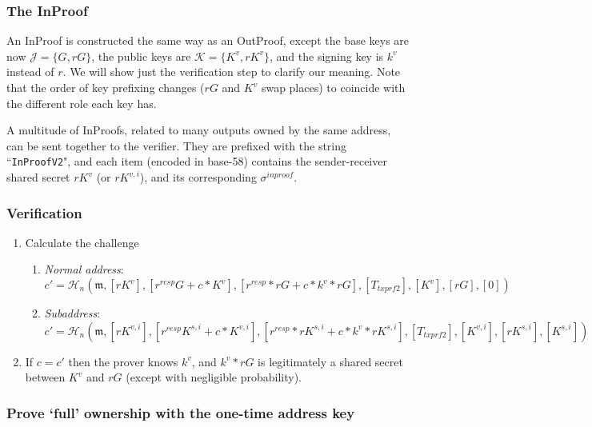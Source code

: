 \subsubsection*{The InProof}

An InProof is constructed the same way as an OutProof, except the base keys are now $\mathcal{J} = \{G, r G\}$, the public keys are $\mathcal{K} = \{K^v, r K^{v}\}$, and the signing key is $k^v$ instead of $r$. We will show just the verification step to clarify our meaning. Note that the order of key prefixing changes ($r G$ and $K^v$ swap places) to coincide with the different role each key has.

A multitude of InProofs, related to many outputs owned by the same address, can be sent together to the verifier. They are prefixed with the string ``{\tt InProofV2}", and each item (encoded in base-58) contains the sender-receiver shared secret $r K^v$ (or $r K^{v,i}$), and its corresponding $\sigma^{inproof}$.

\subsubsection*{Verification}

\begin{enumerate}
    \item Calculate the challenge
    \begin{enumerate}
        \item {\em Normal address}:\vspace{.145cm}
	    \[c' = \mathcal{H}_n(\mathfrak{m},[rK^v], [r^{resp} G + c*K^v], [r^{resp}*r G + c*k^v*r G], [T_{txprf2}], [K^v], [rG], [0])\]
	    \item {\em Subaddress}:\vspace{.16cm}
	    \[c' = \mathcal{H}_n(\mathfrak{m},[rK^{v,i}], [r^{resp} K^{s,i} + c*K^{v,i}], [r^{resp}*r K^{s,i} + c*k^v*r K^{s,i}], [T_{txprf2}], [K^{v,i}], [r K^{s,i}], [K^{s,i}])\]
    \end{enumerate}{}
    \item If $c = c'$ then the prover knows $k^v$, and $k^v*r G$ is legitimately a shared secret between $K^v$ and $r G$ (except with negligible probability).
\end{enumerate}{}

\subsubsection*{Prove `full' ownership with the one-time address key}

